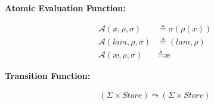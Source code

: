 \documentclass[12pt,draft]{article}
\newcommand\mae{\ensuremath{\text{\ae}}}
\begin{document}
\vspace{-10mm}
\begin{center}
\textbf{Atomic Evaluation Function:}
\end{center}
\vspace{-7mm}
\begin{align*}
\mathcal{A}(x, \rho, \sigma) &\triangleq \sigma(\rho(x)) \\
\mathcal{A}(lam, \rho, \sigma) &\triangleq (lam , \rho) \\
\mathcal{A}(\mae, \rho, \sigma) &\triangleq \mae
\end{align*}
\vspace{-10mm}
\begin{center}
\textbf{Transition Function:}
\end{center}
\vspace{-7mm}
\begin{align*}
(\Sigma \times \textit{Store}) \leadsto (\Sigma \times \textit{Store})
\end{align*}

\newpage



\end{document}

